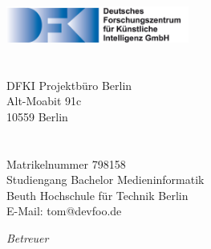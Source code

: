 \begin{titlepage}
	\tgherosfont
	\centering

	{\Large \thesisUniversity} \\[4mm]
	\includegraphics[width=6cm]{gfx/DFKI_Schrift_de} \\[2mm]
	\textsf{\thesisUniversityDepartment} \\
	\textsf{\thesisUniversityInstitute} \\[5mm]
    {\normalsize DFKI Projektbüro Berlin}\\
    {\normalsize Alt-Moabit 91c}\\
    {\normalsize 10559 Berlin}\\
	\vfill
	{\LARGE \color{ctcolortitle}\textbf{\thesisTitle} \\[10mm]}
	{\Large \thesisName} \\[5mm]
    {\normalsize Matrikelnummer 798158} \\
	{\normalsize Studiengang Bachelor Medieninformatik} \\
    {\normalsize Beuth Hochschule für Technik Berlin} \\[5mm]
	{\small E-Mail: tom@devfoo.de} \\

	\vfill
	\begin{minipage}[t]{.27\textwidth}
		\raggedleft
		\textit{Betreuer}
	\end{minipage}
	\hspace*{15pt}
	\begin{minipage}[t]{.65\textwidth}
		{\Large \thesisFirstReviewer} \\
	  	{\small \thesisFirstReviewerDepartment} \\[-1mm]
		{\small \thesisFirstReviewerUniversity}
	\end{minipage} \\[5mm]
	\begin{minipage}[t]{.27\textwidth}
		\raggedleft
		\textit{ }
	\end{minipage}
	\hspace*{15pt}
	\begin{minipage}[t]{.65\textwidth}
		{\Large \thesisSecondReviewer} \\
	  	{\small \thesisSecondReviewerDepartment} \\[-1mm]
		{\small \thesisSecondReviewerUniversity}
	\end{minipage} \\[10mm]
	\thesisDate \\
\end{titlepage}
